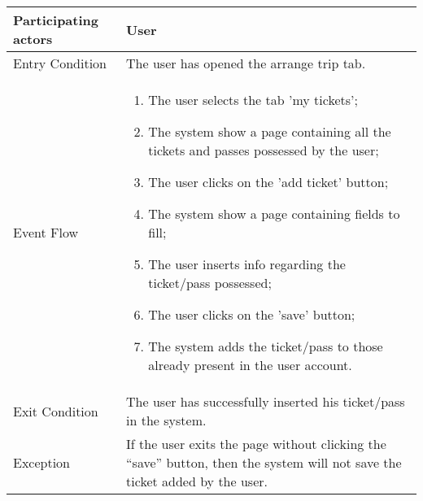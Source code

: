 \begin{table}[H]
	\begin{center}
		\begin{tabular}{ | p{} | p{} | }
		\hline
		Participating actors & User\\
		\hline
		Entry Condition & The user has opened the arrange trip tab.\\
		\hline
		Event Flow & 
			\begin{enumerate}
				\item The user selects the tab 'my tickets';
				\item The system show a page containing all the tickets and passes possessed by the user;
				\item The user clicks on the 'add ticket' button;
				\item The system show a page containing fields to fill;
				\item The user inserts info regarding the ticket/pass possessed;
				\item The user clicks on the 'save' button;
				\item The system adds the ticket/pass to those already present in the user account.
			\end{enumerate} \\
		\hline
		Exit Condition & The user has successfully inserted his ticket/pass in the system.\\
		\hline
		Exception & If the user exits the page without clicking the “save” button, then the system will not save the ticket added by the user.\\ 
		\hline
		\end{tabular}
	\end{center}
\end{table}